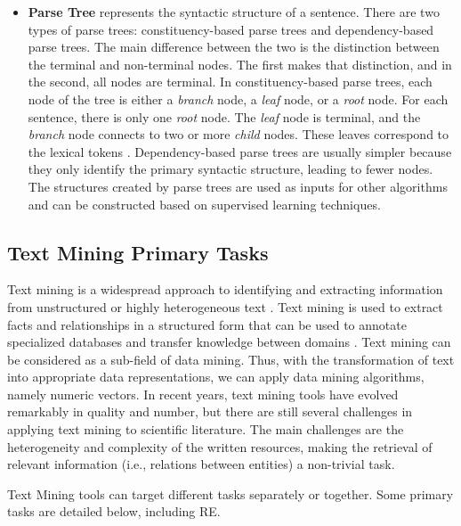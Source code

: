 \begin{itemize}
    \item \textbf{Parse Tree} represents the syntactic structure of a sentence. There are two types of parse trees: constituency-based parse trees and dependency-based parse trees. The main difference between the two is the distinction between the terminal and non-terminal nodes. The first makes that distinction, and in the second, all nodes are terminal. In constituency-based parse trees, each node of the tree is either a \textit{branch} node, a \textit{leaf} node, or a \textit{root} node. For each sentence, there is only one \textit{root} node. The \textit{leaf} node is terminal, and the \textit{branch} node connects to two or more \textit{child} nodes. These leaves correspond to the lexical tokens \citep{aho1986compilers}. Dependency-based parse trees are usually simpler because they only identify the primary syntactic structure, leading to fewer nodes. The structures created by parse trees are used as inputs for other algorithms and can be constructed based on supervised learning techniques.
\end{itemize}

\hypertarget{2.1.2}{\subsection{Text Mining Primary Tasks}}

Text mining is a widespread approach to identifying and extracting information from unstructured or highly heterogeneous text \citep{westergaard2018comprehensive}. Text mining is used to extract facts and relationships in a structured form that can be used to annotate specialized databases and transfer knowledge between domains \citep{fleuren2015application}. Text mining can be considered as a sub-field of data mining. Thus, with the transformation of text into appropriate data representations, we can apply data mining algorithms, namely numeric vectors. In recent years, text mining tools have evolved remarkably in quality and number, but there are still several challenges in applying text mining to scientific literature. The main challenges are the heterogeneity and complexity of the written resources, making the retrieval of relevant information (i.e., relations between entities) a non-trivial task. 

Text Mining tools can target different tasks separately or together. Some primary tasks are detailed below, including RE. 

